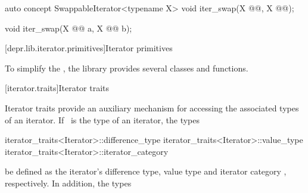 \documentclass[american,twoside]{book}
\begin{document}
\color{addclr}
\begin{itemdecl}
auto concept SwappableIterator<typename X> {
  void iter_swap(X @@, X @@);
}
\end{itemdecl}

\begin{itemdecl}
void iter_swap(X @@ a, X  @@ b);
\end{itemdecl}
\color{black}

\pnum
{}

\appendix
\setcounter{chapter}{3}
\begin{paras}

\setcounter{section}{9}
[depr.lib.iterator.primitives]{Iterator primitives}

\textcolor{black}{\pnum}
To simplify the , the library provides
several classes and functions. 

\pnum
{}

\end{paras}

[iterator.traits]{Iterator traits}

\pnum
{}
{Iterator traits provide an auxiliary mechanism for
accessing the associated types of an iterator. If}
\
is the type of an iterator,
the types

\begin{codeblock}
iterator_traits<Iterator>::difference_type
iterator_traits<Iterator>::value_type
iterator_traits<Iterator>::iterator_category
\end{codeblock}

 be defined as the iterator's difference type, value type and iterator
category \addedConcepts{(24.3.3)}, respectively.
In addition, the types
\end{document}
